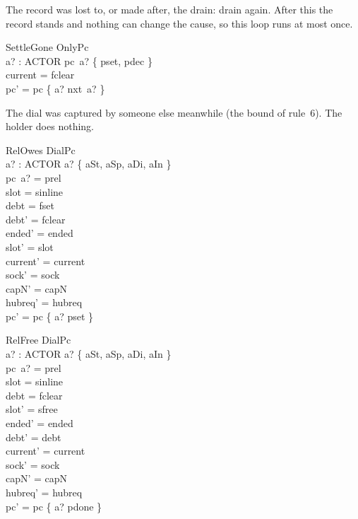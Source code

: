 \documentclass[a4paper,10pt,fleqn]{article}
\begin{document}
The record was lost to, or made after, the drain: drain again.  After this the
record stands and nothing can change the cause, so this loop runs at most once.

\begin{schema}{SettleGone}
  OnlyPc \\
  a? : ACTOR
\where
  pc~a? \in \{ pset, pdec \} \\
  current = fclear \\
  pc' = pc \oplus \{ a? \mapsto nxt~a? \}
\end{schema}

The dial was captured by someone else meanwhile (the bound of rule~6).  The
holder does nothing.

\begin{schema}{RelOwes}
  DialPc \\
  a? : ACTOR
\where
  a? \in \{ aSt, aSp, aDi, aIn \} \\
  pc~a? = prel \\
  slot = sinline \\
  debt = fset \\
  debt' = fclear \\
  ended' = ended \\
  slot' = slot \\
  current' = current \\
  sock' = sock \\
  capN' = capN \\
  hubreq' = hubreq \\
  pc' = pc \oplus \{ a? \mapsto pset \}
\end{schema}

\begin{schema}{RelFree}
  DialPc \\
  a? : ACTOR
\where
  a? \in \{ aSt, aSp, aDi, aIn \} \\
  pc~a? = prel \\
  slot = sinline \\
  debt = fclear \\
  slot' = sfree \\
  ended' = ended \\
  debt' = debt \\
  current' = current \\
  sock' = sock \\
  capN' = capN \\
  hubreq' = hubreq \\
  pc' = pc \oplus \{ a? \mapsto pdone \}
\end{schema}
\end{document}
